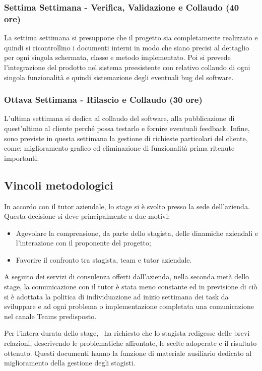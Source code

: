 \subsubsection*{Settima Settimana - Verifica, Validazione e Collaudo (40 ore)}
La settima settimana si presuppone che il progetto sia completamente realizzato e quindi si ricontrollino i documenti interni in modo che siano precisi al dettaglio per ogni singola schermata, classe e metodo implementato.
Poi si prevede l'integrazione del prodotto nel sistema preesistente con relativo collaudo di ogni singola funzionalità e quindi sistemazione degli eventuali bug del software.


\subsubsection*{Ottava Settimana - Rilascio e Collaudo (30 ore)}
L'ultima settimana si dedica al collaudo del software, alla pubblicazione di quest'ultimo al cliente perché possa testarlo e fornire eventuali feedback. Infine, sono previste in questa settimana la gestione di richieste particolari del cliente, come: miglioramento grafico ed eliminazione di funzionalità prima ritenute importanti.


\subsection{Vincoli metodologici}
In accordo con il tutor aziendale, lo stage si è svolto presso la sede dell'azienda. Questa decisione si deve principalmente a due motivi: 
\begin{itemize}
	\item Agevolare la comprensione, da parte dello stagista, delle dinamiche aziendali e l’interazione con il proponente del progetto; 
	\item Favorire il confronto tra stagista, team e tutor aziendale.
\end{itemize}
A seguito dei servizi di consulenza offerti dall'azienda, nella seconda metà dello stage, la comunicazione con il tutor è stata meno constante ed in previsione di ciò si è adottata la politica di individuazione ad inizio settimana dei task da sviluppare e ad ogni problema o implementazione completata una comunicazione nel canale Teams predisposto.

Per l'intera durata dello stage, \azienda\ ha richiesto che lo stagista redigesse delle brevi relazioni, descrivendo le problematiche affrontate, le scelte adoperate e il risultato ottenuto. Questi documenti hanno la funzione di materiale ausiliario dedicato al miglioramento della gestione degli stagisti.

